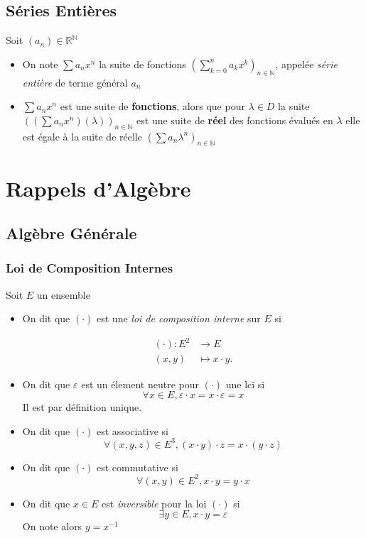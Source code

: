 \documentclass[11pt,colorlinks]{book}
\theoremstyle{mytheoremstyle}
\theoremstyle{mytheoremstyle}
\theoremstyle{mytheoremstyle}
\theoremstyle{mytheoremstyle}
\theoremstyle{mytheoremstyle}
\theoremstyle{mytheoremstyle}
\theoremstyle{mytheoremstyle}
\theoremstyle{mytheoremstyle}
\theoremstyle{myproblemstyle}
\def\mbb#1{\mathbb{#1}}
\def\bN{\mbb{N}}
\def\bR{\mbb{R}}
\def\rN{\bR^{\bN}}
\newcommand{\vfunc}[5]{
  \begin{align*}
    #1 \colon #2 &\to #3\\
    #4 &\mapsto #5.
  \end{align*}
}
\begin{document}
\subsection{Séries Entières}
\begin{rmq}
  Soit $(a_n) \in \rN$ 
  \begin{itemize}
    \item On note $\sum a_n x^n$ la suite de fonctions $\left(\sum_{k=0}^n a_k x^k\right)_{n\in \bN}$, appelée
    \textit{série entière} de terme général $a_n$
    \item $\sum a_n x^n$ est une suite de \textbf{fonctions}, alors que pour $\lambda \in D$ la suite $\left(\left(\sum a_n x^n\right)(\lambda)\right)_{n \in \bN}$
    est une suite de \textbf{réel} des fonctions évalués en $\lambda$ elle est égale à la suite de réelle $\left(\sum a_n \lambda^n\right)_{n \in \bN}$
    \end{itemize}
\end{rmq}
\section{Rappels d'Algèbre}
\subsection{Algèbre Générale}
\subsubsection{Loi de Composition Internes}
\begin{rmq}
  Soit $E$ un ensemble
  \begin{itemize}
    \item On dit que $(\cdot)$ est une \textit{loi de composition interne} sur $E$ si 
    \vfunc{(\cdot)}{E^2}{E}{(x,y)}{x\cdot y}
    \item On dit que $\varepsilon$ est un élement neutre pour $(\cdot)$ une lci si 
    \begin{equation*}
      \forall x \in E, \varepsilon \cdot x = x \cdot \varepsilon = x
    \end{equation*}
    Il est par définition unique.
    \item On dit que $(\cdot)$ est associative si 
    \begin{equation*}
      \forall (x,y,z) \in E^3, (x \cdot y) \cdot z = x \cdot (y \cdot z)
    \end{equation*}
    \item On dit que $(\cdot)$ est commutative si 
    \begin{equation*}
      \forall (x,y) \in E^2, x \cdot y = y \cdot x
    \end{equation*}
    \item On dit que $x \in E$ est \textit{inversible} pour la loi $(\cdot)$ si 
    \begin{equation*}
      \exists y \in E, x\cdot y = \varepsilon
    \end{equation*}
    On note alors $y = x^{-1}$
  \end{itemize}
\end{rmq}
\end{document}
